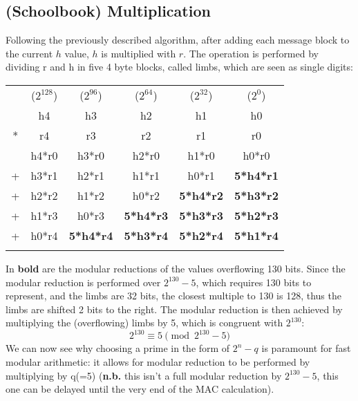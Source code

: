 \documentclass{article}
\begin{document}
\subsection{(Schoolbook) Multiplication}
Following the previously described algorithm, after adding each message block to the current $h$ value, $h$ is multiplied with $r$. 
The operation is performed by dividing r and h in five 4 byte blocks, called limbs, which are seen as single digits:
\begin{footnotesize}
\begin{tabular}{cccccc}
\\
    & ($2^{128}$)   & ($2^{96}$)    & ($2^{64}$)    & ($2^{32}$)    & ($2^{0}$)     \\
    & h4            & h3            & h2            & h1            & h0            \\
*   & r4            & r3            & r2            & r1            & r0            \\
\hline
    & h4*r0 & h3*r0 & h2*r0 & h1*r0 & h0*r0 \\
+   & h3*r1 & h2*r1 & h1*r1 & h0*r1 & \textbf{5*h4*r1} \\
+   & h2*r2 & h1*r2 & h0*r2 & \textbf{5*h4*r2} & \textbf{5*h3*r2} \\
+   & h1*r3 & h0*r3 & \textbf{5*h4*r3} & \textbf{5*h3*r3} & \textbf{5*h2*r3} \\
+   & h0*r4 & \textbf{5*h4*r4} & \textbf{5*h3*r4} & \textbf{5*h2*r4} & \textbf{5*h1*r4}\\
    &    &    &    &    &    \\
\end{tabular}
\end{footnotesize}
In \textbf{bold} are the modular reductions of the values overflowing 130 bits. Since the modular reduction is performed over $2^{130}-5$, which requires 130 bits
to represent, and the limbs are 32 bits, the closest multiple to 130 is 128, thus the limbs are shifted 2 bits to the right. 
The modular reduction is then achieved by multiplying the (overflowing) limbs by 5, which is congruent with $2^{130}$:
$$2^{130} \equiv 5 \pmod{2^{130}-5}$$ 
We can now see why choosing a prime in the form of $2^n-q$ is paramount for fast modular arithmetic: it allows for modular reduction to be performed by multiplying 
by q(=5) (\textbf{n.b.} this isn't a full modular reduction by $2^{130}-5$, this one can be delayed until the very end of the MAC calculation).
\end{document}
